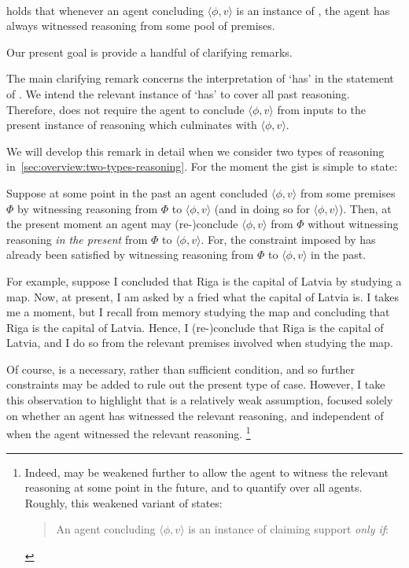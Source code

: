 \paragraph*{\ESU{}}

\begin{note}
  \ESU{} holds that whenever an agent concluding \(\langle \phi,v \rangle\) is an instance of , the agent has always witnessed reasoning from some pool of premises.

  Our present goal is provide a handful of clarifying remarks.
\end{note}

\begin{note}
  The main clarifying remark concerns the interpretation of `has' in the statement of \ESU{}.
  We intend the relevant instance of `has' to cover all past reasoning.
  Therefore, \ESU{} does not require the agent to conclude \(\langle \phi,v \rangle\) from inputs to the present instance of reasoning which culminates with \(\langle \phi,v \rangle\).

  We will develop this remark in detail when we consider two types of reasoning in~\autoref{sec:overview:two-types-reasoning}.
  For the moment the gist is simple to state:

  Suppose at some point in the past an agent concluded \(\langle \phi,v \rangle\) from some premises \(\Phi\) by witnessing reasoning from \(\Phi\) to \(\langle \phi,v \rangle\) (and in doing so \csVed{} for \(\langle \phi,v \rangle\)).
  Then, at the present moment an agent may (re-)conclude \(\langle \phi,v \rangle\) from \(\Phi\) without witnessing reasoning \emph{in the present} from \(\Phi\) to \(\langle \phi,v \rangle\).
  For, the constraint imposed by \ESU{} has already been satisfied by witnessing reasoning from \(\Phi\) to \(\langle \phi,v \rangle\) in the past.

  For example, suppose I concluded that Riga is the capital of Latvia by studying a map.
  Now, at present, I am asked by a fried what the capital of Latvia is.
  I takes me a moment, but I recall from memory studying the map and concluding that Riga is the capital of Latvia.
  Hence, I (re-)conclude that Riga is the capital of Latvia, and I do so from the relevant premises involved when studying the map.

  Of course, \ESU{} is a necessary, rather than sufficient condition, and so further constraints may be added to rule out the present type of case.
  However, I take this observation to highlight that \ESU{} is a relatively weak assumption, focused solely on whether an agent has witnessed the relevant reasoning, and independent of when the agent witnessed the relevant reasoning.%
  \footnote{
    \label{ft:weak-esu}
    Indeed, \ESU{} may be weakened further to allow the agent to witness the relevant reasoning at some point in the future, and to quantify over all agents.
    Roughly, this weakened variant of \ESU{} states:
    \begin{quote}
      An agent concluding \(\langle \phi,v \rangle\) is an instance of claiming support \emph{only if}:


\end{quote}}
\end{note}
